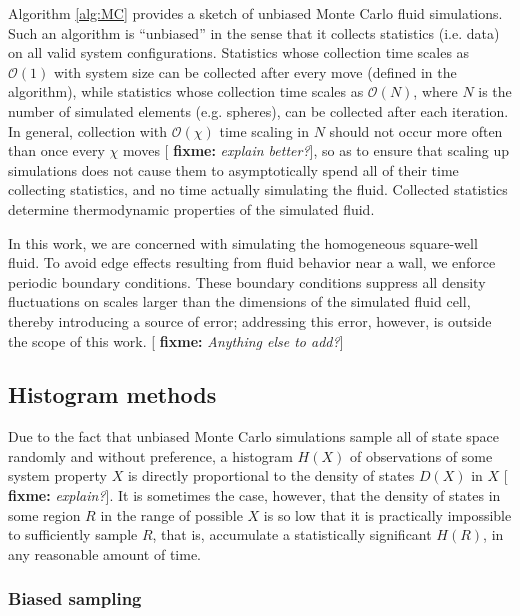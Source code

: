 \documentclass[11pt]{article}
\newcommand{\p}[1]{\left(#1\right)} %
\newcommand{\red}[1]{{\bf \color{red} #1}}
\newcommand{\fixme}[1]{[\red{fixme:} \emph{#1}]}
\begin{document}
Algorithm \ref{alg:MC} provides a sketch of unbiased Monte Carlo fluid
simulations. Such an algorithm is ``unbiased'' in the sense that it
collects statistics (i.e. data) on all valid system
configurations. Statistics whose collection time scales as $\mathcal
O\p{1}$ with system size can be collected after every move (defined in
the algorithm), while statistics whose collection time scales as
$\mathcal O\p{N}$, where $N$ is the number of simulated elements
(e.g. spheres), can be collected after each iteration. In general,
collection with $\mathcal O\p{\chi}$ time scaling in $N$ should not
occur more often than once every $\chi$ moves \fixme{explain better?},
so as to ensure that scaling up simulations does not cause them to
asymptotically spend all of their time collecting statistics, and no
time actually simulating the fluid. Collected statistics determine
thermodynamic properties of the simulated fluid.

In this work, we are concerned with simulating the homogeneous
square-well fluid. To avoid edge effects resulting from fluid behavior
near a wall, we enforce periodic boundary conditions. These boundary
conditions suppress all density fluctuations on scales larger than the
dimensions of the simulated fluid cell, thereby introducing a source
of error; addressing this error, however, is outside the scope of this
work. \fixme{Anything else to add?}

\subsection{Histogram methods}
\label{sec:histogram_methods}

Due to the fact that unbiased Monte Carlo simulations sample all of
state space randomly and without preference, a histogram $H\p{X}$ of
observations of some system property $X$ is directly proportional to
the density of states $D\p{X}$ in $X$ \fixme{explain?}. It is
sometimes the case, however, that the density of states in some region
$R$ in the range of possible $X$ is so low that it is practically
impossible to sufficiently sample $R$, that is, accumulate a
statistically significant $H\p{R}$, in any reasonable amount of time.

\subsubsection{Biased sampling}
\label{sec:biased_sampling}
\end{document}
